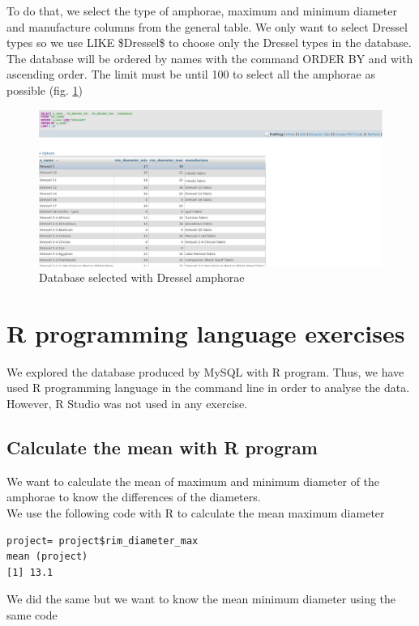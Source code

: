 \documentclass[10pt,a4paper]{article}
\begin{document}
To do that, we select the type of amphorae, maximum and minimum diameter and manufacture columns from the general table. We only want to select Dressel types so we use LIKE \$Dressel\$ to choose only the Dressel types in the database. The database will be ordered by names with the command ORDER BY and with ascending order. The limit must be until 100 to select all the amphorae as possible (fig. \ref{query5})

\begin{figure}[htp]
\centering
\includegraphics[scale=0.30]{query5.png}
\caption{Database selected with Dressel amphorae}
\label{query5}
\end{figure} 

\section{R programming language exercises}

We explored the database produced by MySQL with R program. Thus, we have used R programming language in the command line in order to analyse the data. However, R Studio was not used in any exercise. 

\subsection{Calculate the mean with R program}

We want to calculate the mean of maximum and minimum diameter of the amphorae to know the differences of the diameters.\\

We use the following code with R to calculate the mean maximum diameter

\begin{verbatim}
project= project$rim_diameter_max
mean (project)
[1] 13.1
\end{verbatim}

We did the same but we want to know the mean minimum diameter using the same code
\end{document}
